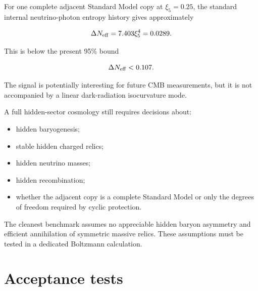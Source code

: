 \documentclass[
  10pt,
]{article}
\providecommand{\tightlist}{%
  \setlength{\itemsep}{0pt}\setlength{\parskip}{0pt}}
\begin{document}
For one complete adjacent Standard Model copy at \(\xi_5=0.25\), the
standard internal neutrino-photon entropy history gives approximately

\[
\Delta N_{\rm eff}
=7.403\xi_5^4
=0.0289.
\]

This is below the present 95\% bound

\[
\Delta N_{\rm eff}<0.107.
\]

The signal is potentially interesting for future CMB measurements, but
it is not accompanied by a linear dark-radiation isocurvature mode.

A full hidden-sector cosmology still requires decisions about:

\begin{itemize}
\tightlist
\item
  hidden baryogenesis;
\item
  stable hidden charged relics;
\item
  hidden neutrino masses;
\item
  hidden recombination;
\item
  whether the adjacent copy is a complete Standard Model or only the
  degrees of freedom required by cyclic protection.
\end{itemize}

The cleanest benchmark assumes no appreciable hidden baryon asymmetry
and efficient annihilation of symmetric massive relics. These
assumptions must be tested in a dedicated Boltzmann calculation.

\section{Acceptance tests}\label{acceptance-tests}
\end{document}
